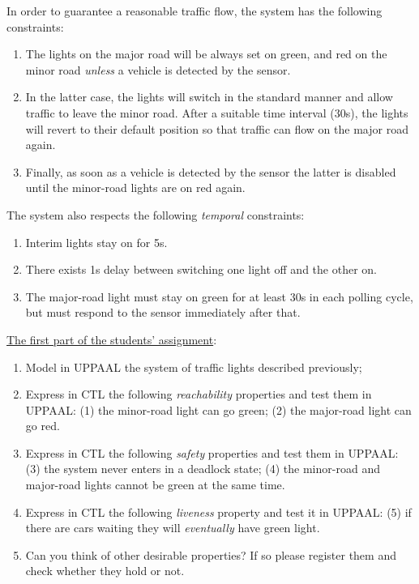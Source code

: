 \documentclass[11pt]{article}
\theoremstyle{myplain}
\theoremstyle{definition} %
\begin{document}
In order to guarantee a reasonable traffic flow, the system has 
the following constraints:
\begin{enumerate}
\item The lights on the major road will be always set on green, and red
	on the minor road \emph{unless} a vehicle is detected by the sensor.
\item In the latter case, the lights will switch in the standard
  manner and allow traffic to leave the minor road.  After a suitable
  time interval (30s), the lights will revert to their default
  position so that traffic can flow on the major road again.
\item Finally, as soon as a vehicle is detected by the sensor the
  latter is disabled until the minor-road lights are on red again.
\end{enumerate}

The system also respects the following \emph{temporal} constraints:
\begin{enumerate}
\item Interim lights stay on for 5s.
\item There exists 1s delay between switching one light off and the
  other on.
\item The major-road light must stay on green for at least 30s in each
  polling cycle, but must respond to the sensor immediately after
  that.
\end{enumerate}
\underline{The first part of the students' assignment}:
\begin{enumerate}
\item Model in \textsc{UPPAAL} the system of traffic lights described
  previously;
\item Express in \textsc{CTL} the following \emph{reachability}
  properties and test them in \textsc{UPPAAL}: (1) the minor-road
  light can go green; (2) the major-road light can go red.
\item Express in \textsc{CTL} the following \emph{safety} properties
  and test them in \textsc{UPPAAL}: (3) the system never enters in a
  deadlock state; (4) the minor-road and major-road lights cannot be
  green at the same time.
\item Express in \textsc{CTL} the following \emph{liveness} property
  and test it in \textsc{UPPAAL}: (5) if there are cars waiting they
  will \emph{eventually} have green light.
\item Can you think of other desirable properties?  If so please register
  them and check whether they hold or not.
\end{enumerate}
\end{document}
